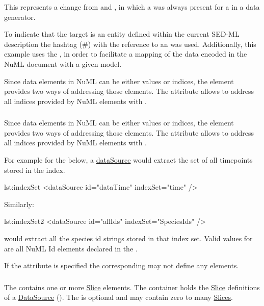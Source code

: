 This represents a change from \LoneVone and \LoneVtwo, in which a  was always present for a  in a data generator.

To indicate that the target is an entity defined within the current SED-ML description the hashtag (\#) with the reference to an  was used. Additionally, this example uses the , in order to facilitate a mapping of the data encoded in the NuML document with a given model. 

Since data elements in NuML can be either values or indices, the \SedDataSource element provides two ways of addressing those elements. The  attribute allows to address all indices provided by NuML elements with . 


\subsubsection{}
\label{sec:indexSet}
Since data elements in NuML can be either values or indices, the \SedDataSource element provides two ways of addressing those elements. The  attribute allows to address all indices provided by NuML elements with . 

For example for the   below, a \hyperref[class:dataSource]{dataSource} would extract the set of all timepoints stored in the index.

\begin{myXmlLst}{}{lst:indexSet}
<dataSource id="dataTime" indexSet="time" />
\end{myXmlLst} 

Similarly: 

\begin{myXmlLst}{}{lst:indexSet2}
<dataSource id="allIds" indexSet="SpeciesIds" />
\end{myXmlLst} 

would extract all the species id strings stored in that index set. Valid values for  are all NuML Id elements declared in the . 

If the  attribute is specified the corresponding  may not define any  elements.


\subsubsection{}
\label{sec:listOfSlices}
The  contains one or more \hyperref[class:slice]{Slice} elements.
The  container holds the \hyperref[class:slice]{Slice} definitions of a \hyperref[class:dataSource]{DataSource} (). The  is optional and may contain zero to many \hyperref[class:slice]{Slices}.

